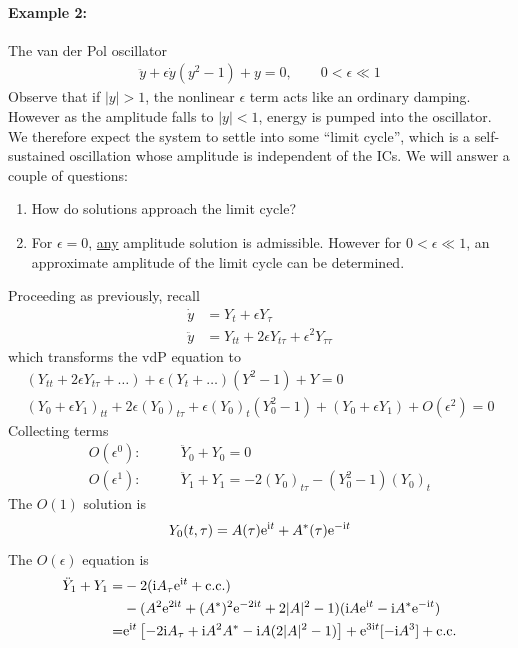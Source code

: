 \paragraph{Example 2:} The van der Pol oscillator
\begin{gather}
	\ddot{y} + \epsilon \dot{y}(y^2 -1) + y = 0, \qquad 0 < \epsilon \ll 1 \label{eqn:wk23-ode-vdP}
\end{gather}
Observe that if $|y|>1$, the nonlinear $\epsilon$ term acts like an ordinary damping. However as the amplitude falls to $|y|<1$, energy is pumped into the oscillator. We therefore expect the system to settle into some ``limit cycle'', which is a self-sustained oscillation whose amplitude is independent of the ICs. We will answer a couple of questions:
\begin{enumerate}
	\item How do solutions approach the limit cycle?
	\item For $\epsilon=0$, \underline{any} amplitude solution is admissible. However for $0<\epsilon \ll 1$, an approximate amplitude of the limit cycle can be determined.
\end{enumerate}
Proceeding as previously, recall
\begin{align*}
	\dot y &= Y_t + \epsilon Y_\tau \\
	\ddot{y} &= Y_{tt} + 2\epsilon Y_{t\tau} + \epsilon^2 Y_{\tau \tau }
\end{align*}
which transforms the vdP equation to
\begin{gather*}
	(Y_{tt} + 2\epsilon Y_{t\tau} + \dots ) + \epsilon ( Y_t + \dots) (Y^2-1) + Y = 0 \\
	(Y_0 + \epsilon Y_1)_{tt} + 2 \epsilon (Y_0)_{t\tau} + \epsilon (Y_0)_t (Y_0^2-1) + (Y_0 + \epsilon Y_1) + O(\epsilon^2) = 0
\end{gather*}
Collecting terms
\begin{align*}
	O(\epsilon^0): \qquad & \ddot Y_0 + Y_0 = 0\\
	O(\epsilon^1): \qquad & \ddot Y_1 + Y_1 = -2 (Y_0)_{t\tau } - (Y_0^2-1)(Y_0)_t
\end{align*}
The $O(1)$ solution is
\begin{gather*}
	Y_0(t,\tau) = A(\tau) \mathrm{e}^{\mathrm{i} t} + A^\ast (\tau) \mathrm{e}^{-\mathrm{i} t} 
\end{gather*}
The $O(\epsilon)$ equation is
\begin{align*}
	\ddot Y_1 + Y_1 = &-2(\mathrm{i} A_\tau \mathrm{e}^{\mathrm{i} t} + \text{c.c.}) \\
	&- (A^2 \mathrm{e}^{2\mathrm{i} t} + (A^\ast)^2 \mathrm{e}^{-2\mathrm{i} t} + 2 |A|^2-1)(\mathrm{i} A \mathrm{e}^{\mathrm{i} t} -\mathrm{i} A^\ast \mathrm{e}^{-\mathrm{i} t}) \\
	=& \mathrm{e}^{\mathrm{i} t} \left[ -2 \mathrm{i} A_\tau + \mathrm{i} A^2 A^\ast - \mathrm{i} A(2 |A|^2-1) \right] + \mathrm{e}^{3\mathrm{i} t}[-\mathrm{i} A^3] + \text{c.c.}
\end{align*}
